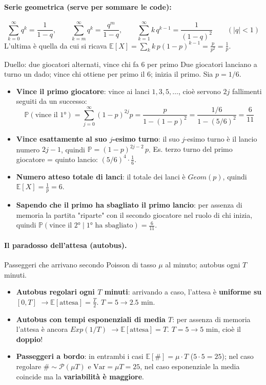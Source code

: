 \documentclass[12pt]{extarticle} %
\begin{document}
\vspace{0.3cm}
\paragraph{Serie geometrica (serve per sommare le code):}
$$ \sum_{k=0}^{\infty} q^k = \frac{1}{1-q}, \qquad \sum_{k=m}^{\infty} q^k = \frac{q^m}{1-q}, \qquad \sum_{k=1}^{\infty} k\,q^{k-1} = \frac{1}{(1-q)^2} \qquad (|q|<1) $$
{\footnotesize L'ultima è quella da cui si ricava $\mathbb{E}[X] = \sum_k k\,p(1-p)^{k-1} = \frac{p}{p^2} = \frac1p$.}

\begin{eserciziobox}{{Duello: due giocatori alternati, vince chi fa 6 per primo}}
Due giocatori lanciano a turno un dado; vince chi ottiene per primo il 6; inizia il primo. Sia $p = 1/6$.
\begin{itemize}
    \item \textbf{Vince il primo giocatore}: vince ai lanci $1, 3, 5, \dots$, cioè servono $2j$ fallimenti seguiti da un successo:
    $$ \mathbb{P}(\text{vince il 1°}) = \sum_{j=0}^{\infty} (1-p)^{2j} p = \frac{p}{1-(1-p)^2} = \frac{1/6}{1-(5/6)^2} = \frac{6}{11} $$
    \item \textbf{Vince esattamente al suo $j$-esimo turno}: il suo $j$-esimo turno è il lancio numero $2j-1$, quindi $\mathbb{P} = (1-p)^{2j-2}\,p$. {\footnotesize Es. terzo turno del primo giocatore = quinto lancio: $(5/6)^4 \cdot \frac16$.}
    \item \textbf{Numero atteso totale di lanci}: il totale dei lanci è $Geom(p)$, quindi $\mathbb{E}[X] = \frac1p = 6$.
    \item \textbf{Sapendo che il primo ha sbagliato il primo lancio}: per assenza di memoria la partita "riparte" con il secondo giocatore nel ruolo di chi inizia, quindi $\mathbb{P}(\text{vince il 2°} \mid \text{1° ha sbagliato}) = \frac{6}{11}$.
\end{itemize}
\end{eserciziobox}

\vspace{0.3cm}
\paragraph{Il paradosso dell'attesa (autobus).} Passeggeri che arrivano secondo Poisson di tasso $\mu$ al minuto; autobus ogni $T$ minuti.
\begin{itemize}
    \item \textbf{Autobus regolari ogni $T$ minuti}: arrivando a caso, l'attesa è \textbf{uniforme su $[0,T]$} $\to \mathbb{E}[\text{attesa}] = \frac{T}{2}$. {\footnotesize $T=5 \to 2.5$ min.}
    \item \textbf{Autobus con tempi esponenziali di media $T$}: per assenza di memoria l'attesa è ancora $Exp(1/T)$ $\to \mathbb{E}[\text{attesa}] = T$. {\footnotesize $T=5 \to 5$ min, cioè il \textbf{doppio}!}
    \item \textbf{Passeggeri a bordo}: in entrambi i casi $\mathbb{E}[\#] = \mu \cdot T$ {\footnotesize ($5 \cdot 5 = 25$)}; nel caso regolare $\#\sim \mathcal{P}(\mu T)$ e $\mathrm{Var} = \mu T = 25$, nel caso esponenziale la media coincide ma la \textbf{variabilità è maggiore}.
\end{itemize}
\end{document}
